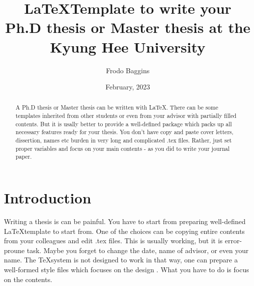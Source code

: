 \documentclass[11pt,b5paper,oneside]{article}
\title{\LaTeX Template to write your Ph.D thesis or Master thesis at the Kyung Hee University}
\author{Frodo Baggins}
\date{February, 2023}
\begin{document}
\makefrontmatters

\begin{abstract}%
A Ph.D thesis or Master thesis can be written with \LaTeX. There can be some templates inherited from other students or even from your advisor with partially filled contents. But it is usally better to provide a well-defined package which packs up all necessary features ready for your thesis. You don't have copy and paste cover letters, dissertion, names etc burden in very long and complicated .tex files. Rather, just set proper variables and focus on your main contents - as you did to write your journal paper.
\end{abstract}

\section{Introduction}
Writing a thesis is can be painful. You have to start from preparing well-defined \LaTeX template to start from. One of the choices can be copying entire contents from your colleagues and edit .tex files. This is usually working, but it is error-proune task. Maybe you forget to change the date, name of advisor, or even your name. The \TeX system is not designed to work in that way, one can prepare a well-formed style files which focuses on the design \cite{texbook,latex:companion,latex2e,knuth:1984,lesk:1977}. What you have to do is focus on the contents.

\newpage

\end{document}
